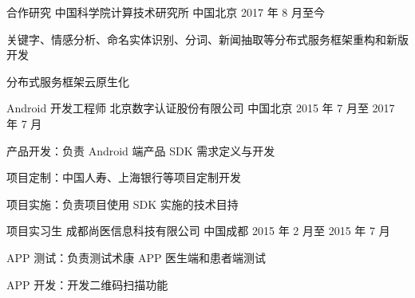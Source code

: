 

\begin{cventries}

  \cventry
    {合作研究} %
    {中国科学院计算技术研究所} %
    {中国北京} %
    {2017 年 8 月至今} %
    {
      \begin{cvitems} %
        \item 关键字、情感分析、命名实体识别、分词、新闻抽取等分布式服务框架重构和新版开发
        \item 分布式服务框架云原生化
      \end{cvitems}
    }

  \cventry
    {Android 开发工程师} %
    {北京数字认证股份有限公司} %
    {中国北京} %
    {2015 年 7 月至 2017 年 7 月} %
    {
      \begin{cvitems} %
        \item 产品开发：负责 Android 端产品 SDK 需求定义与开发
        \item 项目定制：中国人寿、上海银行等项目定制开发
        \item 项目实施：负责项目使用 SDK 实施的技术目持
      \end{cvitems}
    }

  \cventry
    {项目实习生} %
    {成都尚医信息科技有限公司} %
    {中国成都} %
    {2015 年 2 月至 2015 年 7 月} %
    {
      \begin{cvitems} %
        \item APP 测试：负责测试术康 APP 医生端和患者端测试
        \item APP 开发：开发二维码扫描功能
      \end{cvitems}
    }

\end{cventries}
